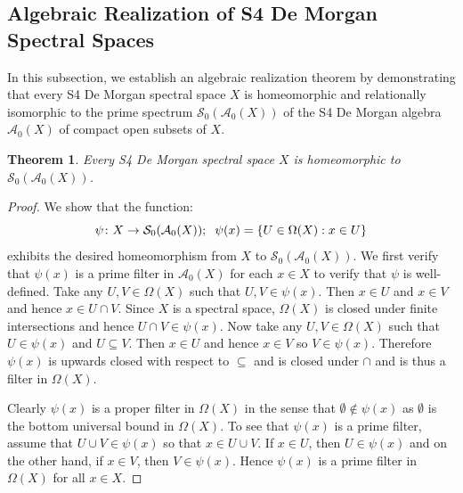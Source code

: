 \documentclass{amsart}
\theoremstyle{plain}
\newtheorem{theorem}{Theorem}[section]
\theoremstyle{definition}
\begin{document}
\subsection{Algebraic Realization of S4 De Morgan Spectral Spaces}
In this subsection, we establish an algebraic realization theorem by demonstrating that every S4 De Morgan spectral space $X$ is homeomorphic and relationally isomorphic to the prime spectrum $\mathcal{S}_0(\mathcal{A}_0(X))$ of the S4 De Morgan algebra $\mathcal{A}_0(X)$ of compact open subsets of $X$. 
\begin{theorem}\label{homeo}
    Every S4 De Morgan spectral space $X$ is homeomorphic to $\mathcal{S}_0(\mathcal{A}_0(X))$. 
\end{theorem}
\begin{proof}
    We show that the function: \[\psi\colon X\to\mathcal{S}_0(\mathcal{A}_0(X));\hspace{.2cm}\psi(x)=\{U\in\Omega(X):x\in U\}\] exhibits the desired homeomorphism from $X$ to $\mathcal{S}_0(\mathcal{A}_0(X))$. We first verify that $\psi(x)$ is a prime filter in $\mathcal{A}_0(X)$ for each $x\in X$ to verify that $\psi$ is well-defined. Take any $U,V\in\Omega(X)$ such that $U,V\in \psi(x)$. Then $x\in U$ and $x\in V$ and hence $x\in U\cap V$. Since $X$ is a spectral space, $\Omega(X)$ is closed under finite intersections and hence $U\cap V\in \psi(x)$. Now take any $U,V\in\Omega(X)$ such that $U\in \psi(x)$ and $U\subseteq V$. Then $x\in U$ and hence $x\in V$ so $V\in \psi(x)$. Therefore $\psi(x)$ is upwards closed with respect to $\subseteq$ and is closed under $\cap$ and is thus a filter in $\Omega(X)$.
    
    
    Clearly $\psi(x)$ is a proper filter in $\Omega(X)$ in the sense that $\emptyset\not\in \psi(x)$ as $\emptyset$ is the bottom universal bound in $\Omega(X)$. To see that $\psi(x)$ is a prime filter, assume that $U\cup V\in \psi(x)$ so that $x\in U\cup V$. If $x\in U$, then $U\in \psi(x)$ and on the other hand, if $x\in V$, then $V\in \psi(x)$. Hence $\psi(x)$ is a prime filter in $\Omega(X)$ for all $x\in X$. 


\end{proof}
\end{document}

